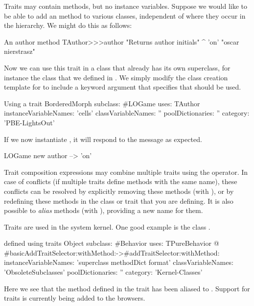 \documentclass[a4paper,10pt,twoside]{book}
\begin{document}
Traits may contain methods, but no instance variables.
Suppose we would like to be able to add an  method to various classes, independent of where they occur in the hierarchy.
We might do this as follows:

\begin{method}[author]{An author method}
TAuthor>>>author
    "Returns author initials"
	^ 'on'    "oscar nierstrasz"
\end{method}

\noindent
Now we can use this trait in a class that already has its own superclass, for instance the  class that we defined in .
We simply modify the class creation template for  to include a  keyword argument that specifies that  should be used.

\begin{classdef}[sbegamewithtrait]{Using a trait}
BorderedMorph subclass: #LOGame
	uses: TAuthor
	instanceVariableNames: 'cells'
	classVariableNames: ''
	poolDictionaries: ''
	category: 'PBE-LightsOut'
\end{classdef}

If we now instantiate , it will respond to the  message as expected.

\begin{code}{}
LOGame new author --> 'on'
\end{code}

Trait composition expressions may combine multiple traits using the \ct{+} operator.
In case of conflicts (\ie if multiple traits define methods with the same name), these conflicts can be resolved by explicitly removing these methods (with \ct{-}), or by redefining these methods in the class or trait that you are defining.
It is also possible to \emph{alias} methods (with ), providing a new name for them.

Traits are used in the system kernel.
One good example is the class .

\begin{classdef}[behaviorwithtraits]{ defined using traits}
Object subclass: #Behavior
	uses: TPureBehavior @ {#basicAddTraitSelector:withMethod:->#addTraitSelector:withMethod:}
	instanceVariableNames: 'superclass methodDict format'
	classVariableNames: 'ObsoleteSubclasses'
	poolDictionaries: ''
	category: 'Kernel-Classes'
\end{classdef}
\noindent
Here we see that the method  defined in the trait  has been aliased to .
Support for traits is currently being added to the browsers.
\end{document}
